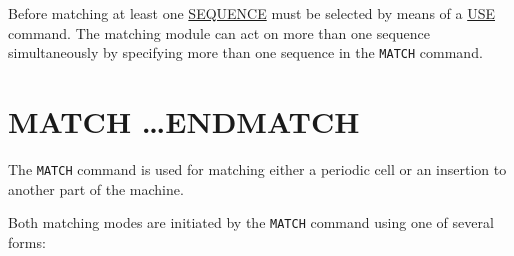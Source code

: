 

%


Before matching at least one
\href{../Introduction/sequence.html}{SEQUENCE} must be selected by means
of a \href{../control/general.html#use}{USE} command. The matching
module can act on more than one sequence simultaneously by specifying
more than one sequence in the \texttt{MATCH} command.
 

\section{MATCH \ldots ENDMATCH}
\label{sec:match}\label{sec:endmatch}

The \texttt{MATCH} command is used for matching either a periodic cell
or an insertion to another part of the machine. 

Both matching modes are initiated by the \texttt{MATCH} command using
one of several forms:





